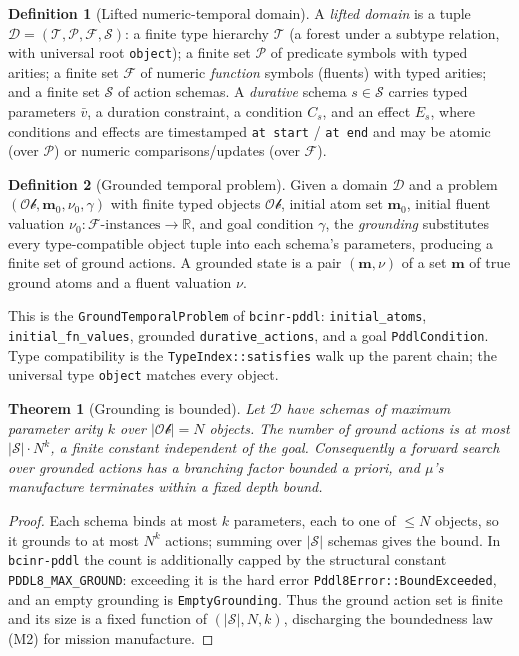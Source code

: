 \documentclass[11pt,oneside]{book}
\theoremstyle{definition}
\newtheorem{definition}{Definition}[chapter]
\theoremstyle{plain}
\newtheorem{theorem}{Theorem}[chapter]
\theoremstyle{remark}
\newcommand{\muop}{\mu}                        %
\newcommand{\code}[1]{\texttt{#1}}
\begin{document}
\begin{definition}[Lifted numeric-temporal domain]\label{def:domain}
A \emph{lifted domain} is a tuple $\mathcal{D}=(\mathcal{T},\mathcal{P},\mathcal{F},
\mathcal{S})$: a finite type hierarchy $\mathcal{T}$ (a forest under a subtype relation, with
universal root \code{object}); a finite set $\mathcal{P}$ of predicate symbols with typed
arities; a finite set $\mathcal{F}$ of numeric \emph{function} symbols (fluents) with typed
arities; and a finite set $\mathcal{S}$ of action schemas. A \emph{durative} schema
$s\in\mathcal{S}$ carries typed parameters $\bar v$, a duration constraint, a condition
$C_s$, and an effect $E_s$, where conditions and effects are timestamped \code{at start} /
\code{at end} and may be atomic (over $\mathcal{P}$) or numeric comparisons/updates (over
$\mathcal{F}$).
\end{definition}

\begin{definition}[Grounded temporal problem]\label{def:ground}
Given a domain $\mathcal{D}$ and a problem $(\mathcal{Ob},\bm m_{0},\nu_{0},\gamma)$ with
finite typed objects $\mathcal{Ob}$, initial atom set $\bm m_{0}$, initial fluent valuation
$\nu_{0}:\mathcal{F}\text{-instances}\to\mathbb{R}$, and goal condition $\gamma$, the
\emph{grounding} substitutes every type-compatible object tuple into each schema's parameters,
producing a finite set of ground actions. A grounded state is a pair
$(\bm m,\nu)$ of a set $\bm m$ of true ground atoms and a fluent valuation $\nu$.
\end{definition}

This is the \code{GroundTemporalProblem} of \code{bcinr-pddl}: \code{initial\_atoms},
\code{initial\_fn\_values}, grounded \code{durative\_actions}, and a goal
\code{PddlCondition}. Type compatibility is the \code{TypeIndex::satisfies} walk up the parent
chain; the universal type \code{object} matches every object.

\begin{theorem}[Grounding is bounded]\label{thm:bounded-ground}
Let $\mathcal{D}$ have schemas of maximum parameter arity $k$ over $|\mathcal{Ob}|=N$ objects.
The number of ground actions is at most $|\mathcal{S}|\cdot N^{k}$, a finite constant
independent of the goal. Consequently a forward search over grounded actions has a branching
factor bounded a priori, and $\muop$'s manufacture terminates within a fixed depth bound.
\end{theorem}

\begin{proof}
Each schema binds at most $k$ parameters, each to one of $\le N$ objects, so it grounds to at
most $N^{k}$ actions; summing over $|\mathcal{S}|$ schemas gives the bound. In \code{bcinr-pddl}
the count is additionally capped by the structural constant \code{PDDL8\_MAX\_GROUND}: exceeding
it is the hard error \code{Pddl8Error::BoundExceeded}, and an empty grounding is
\code{EmptyGrounding}. Thus the ground action set is finite and its size is a fixed function of
$(|\mathcal{S}|,N,k)$, discharging the boundedness law (M2) for mission manufacture. \end{proof}
\end{document}
